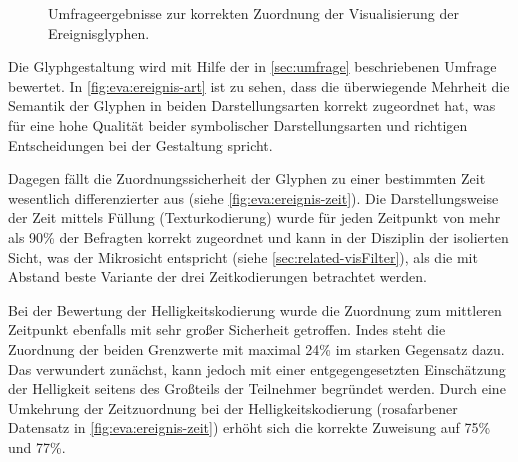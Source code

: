 \begin{figure}
	{\caption{Umfrageergebnisse zur korrekten Zuordnung der Visualisierung der Ereignisglyphen.}\label{fig:eva:ereignis}}
\end{figure}

Die Glyphgestaltung wird mit Hilfe der in \autoref{sec:umfrage} beschriebenen Umfrage bewertet. In \autoref{fig:eva:ereignis-art} ist zu sehen, dass die überwiegende Mehrheit die Semantik der Glyphen in beiden Darstellungsarten korrekt zugeordnet hat, was für eine hohe Qualität beider symbolischer Darstellungsarten und richtigen Entscheidungen bei der Gestaltung spricht. %

Dagegen fällt die Zuordnungssicherheit der Glyphen zu einer bestimmten Zeit wesentlich differenzierter aus (siehe \autoref{fig:eva:ereignis-zeit}). Die Darstellungsweise der Zeit mittels Füllung (Texturkodierung) wurde für jeden Zeitpunkt von mehr als 90\% der Befragten korrekt zugeordnet und kann in der Disziplin der isolierten Sicht, was der Mikrosicht entspricht (siehe \autoref{sec:related-visFilter}), als die mit Abstand beste Variante der drei Zeitkodierungen betrachtet werden.

Bei der Bewertung der Helligkeitskodierung wurde die Zuordnung zum mittleren Zeitpunkt ebenfalls mit sehr großer Sicherheit getroffen. Indes steht die Zuordnung der beiden Grenzwerte mit maximal 24\% im starken Gegensatz dazu. Das verwundert zunächst, kann jedoch mit einer entgegengesetzten Einschätzung der Helligkeit seitens des Großteils der Teilnehmer begründet werden. Durch eine Umkehrung der Zeitzuordnung bei der Helligkeitskodierung (rosafarbener Datensatz in \autoref{fig:eva:ereignis-zeit}) erhöht sich die korrekte Zuweisung auf 75\% und 77\%.


